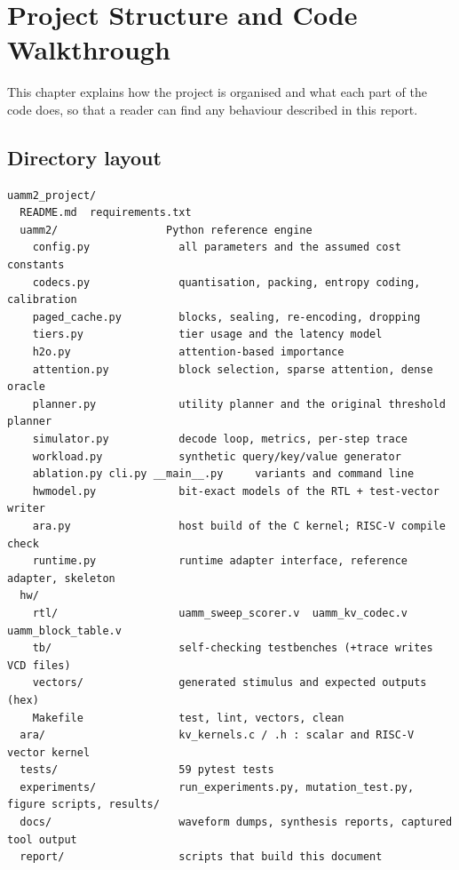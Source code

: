 \documentclass[12pt,a4paper]{report}
\begin{document}
\section{Project Structure and Code Walkthrough}\label{sec:6}
This chapter explains how the project is organised and what each part of the code does, so that a reader can find any behaviour described in this report.

\subsection{Directory layout}\label{sec:6_1}
\begin{lstlisting}
uamm2_project/
  README.md  requirements.txt
  uamm2/                 Python reference engine
    config.py              all parameters and the assumed cost constants
    codecs.py              quantisation, packing, entropy coding, calibration
    paged_cache.py         blocks, sealing, re-encoding, dropping
    tiers.py               tier usage and the latency model
    h2o.py                 attention-based importance
    attention.py           block selection, sparse attention, dense oracle
    planner.py             utility planner and the original threshold planner
    simulator.py           decode loop, metrics, per-step trace
    workload.py            synthetic query/key/value generator
    ablation.py cli.py __main__.py     variants and command line
    hwmodel.py             bit-exact models of the RTL + test-vector writer
    ara.py                 host build of the C kernel; RISC-V compile check
    runtime.py             runtime adapter interface, reference adapter, skeleton
  hw/
    rtl/                   uamm_sweep_scorer.v  uamm_kv_codec.v  uamm_block_table.v
    tb/                    self-checking testbenches (+trace writes VCD files)
    vectors/               generated stimulus and expected outputs (hex)
    Makefile               test, lint, vectors, clean
  ara/                     kv_kernels.c / .h : scalar and RISC-V vector kernel
  tests/                   59 pytest tests
  experiments/             run_experiments.py, mutation_test.py, figure scripts, results/
  docs/                    waveform dumps, synthesis reports, captured tool output
  report/                  scripts that build this document
\end{lstlisting}
\end{document}
